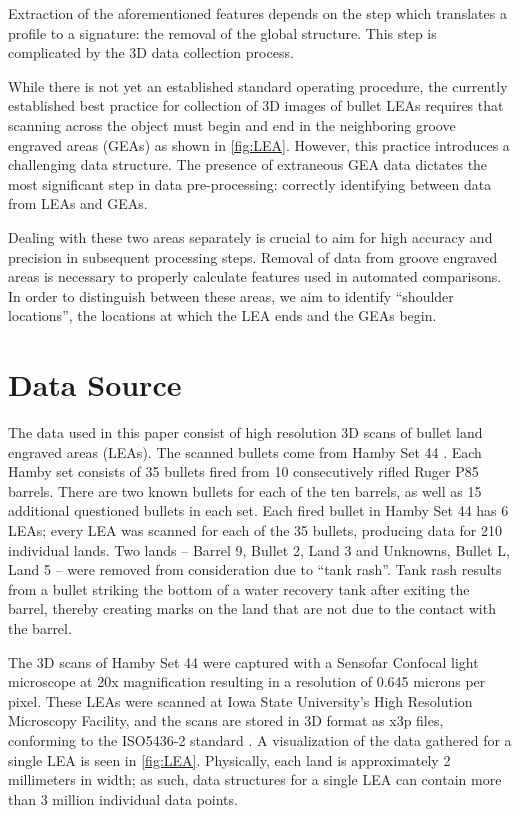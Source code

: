 \documentclass[]{article}
\begin{document}
Extraction of the aforementioned features depends on the step which
translates a profile to a signature: the removal of the global
structure. This step is complicated by the 3D data collection process.

While there is not yet an established standard operating procedure, the
currently established best practice for collection of 3D images of
bullet LEAs requires that scanning across the object must begin and end
in the neighboring groove engraved areas (GEAs) as shown in
\autoref{fig:LEA}. However, this practice introduces a challenging data
structure. The presence of extraneous GEA data dictates the most
significant step in data pre-processing: correctly identifying between
data from LEAs and GEAs.

Dealing with these two areas separately is crucial to aim for high
accuracy and precision in subsequent processing steps. Removal of data
from groove engraved areas is necessary to properly calculate features
used in automated comparisons. In order to distinguish between these
areas, we aim to identify ``shoulder locations'', the locations at which
the LEA ends and the GEAs begin.

\section{Data Source}

The data used in this paper consist of high resolution 3D scans of
bullet land engraved areas (LEAs). The scanned bullets come from Hamby
Set 44 \citep{Hamby}. Each Hamby set consists of 35 bullets fired from
10 consecutively rifled Ruger P85 barrels. There are two known bullets
for each of the ten barrels, as well as 15 additional questioned bullets
in each set. Each fired bullet in Hamby Set 44 has 6 LEAs; every LEA was
scanned for each of the 35 bullets, producing data for 210 individual
lands. Two lands -- Barrel 9, Bullet 2, Land 3 and Unknowns, Bullet L,
Land 5 -- were removed from consideration due to ``tank rash''. Tank
rash results from a bullet striking the bottom of a water recovery tank
after exiting the barrel, thereby creating marks on the land that are
not due to the contact with the barrel.

The 3D scans of Hamby Set 44 were captured with a Sensofar Confocal
light microscope at 20x magnification resulting in a resolution of 0.645
microns per pixel. These LEAs were scanned at Iowa State University's
High Resolution Microscopy Facility, and the scans are stored in 3D
format as x3p files, conforming to the ISO5436-2 standard
\citep{ISO5436}. A visualization of the data gathered for a single LEA
is seen in \autoref{fig:LEA}. Physically, each land is approximately 2
millimeters in width; as such, data structures for a single LEA can
contain more than 3 million individual data points.
\end{document}
